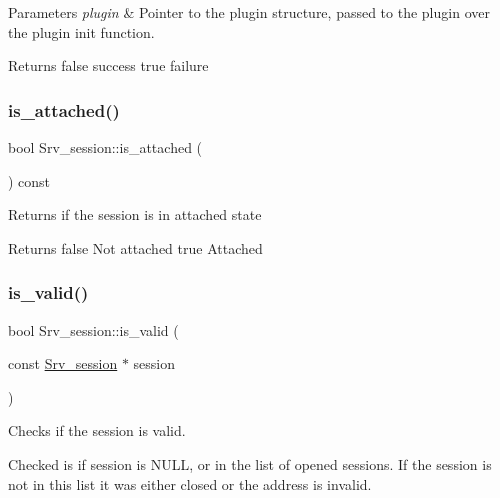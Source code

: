 \begin{DoxyParams}{Parameters}
{\em plugin} & Pointer to the plugin structure, passed to the plugin over the plugin init function.\\
\hline
\end{DoxyParams}
\begin{DoxyReturn}{Returns}
false success true failure 
\end{DoxyReturn}
\mbox{\label{classSrv__session_a53e0d134096447b8f368499bb840201c}} 
\subsubsection{\texorpdfstring{is\+\_\+attached()}{is\_attached()}}
{\footnotesize\ttfamily bool Srv\+\_\+session\+::is\+\_\+attached (\begin{DoxyParamCaption}{ }\end{DoxyParamCaption}) const\hspace{0.3cm}{\ttfamily [inline]}}

Returns if the session is in attached state

\begin{DoxyReturn}{Returns}
false Not attached true Attached 
\end{DoxyReturn}
\mbox{\label{classSrv__session_aae4c0d99ea138cf218f142f322362157}} 
\subsubsection{\texorpdfstring{is\+\_\+valid()}{is\_valid()}}
{\footnotesize\ttfamily bool Srv\+\_\+session\+::is\+\_\+valid (\begin{DoxyParamCaption}\item[{const \mbox{\hyperlink{classSrv__session}{Srv\+\_\+session}} $\ast$}]{session }\end{DoxyParamCaption})\hspace{0.3cm}{\ttfamily [static]}}

Checks if the session is valid.

Checked is if session is N\+U\+LL, or in the list of opened sessions. If the session is not in this list it was either closed or the address is invalid.

